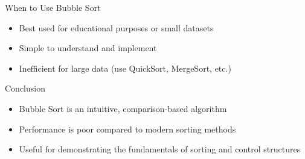 \documentclass[mathserif,20pt,xcolor=table,compress,aspectratio=169]{beamer}
\begin{document}
\begin{frame}{When to Use Bubble Sort}
\begin{itemize}
    \item Best used for educational purposes or small datasets
    \item Simple to understand and implement
    \item Inefficient for large data (use QuickSort, MergeSort, etc.)
\end{itemize}
\end{frame}

\begin{frame}{Conclusion}
\begin{itemize}
    \item Bubble Sort is an intuitive, comparison-based algorithm
    \item Performance is poor compared to modern sorting methods
    \item Useful for demonstrating the fundamentals of sorting and control structures
\end{itemize}
\end{frame}
\end{document}
